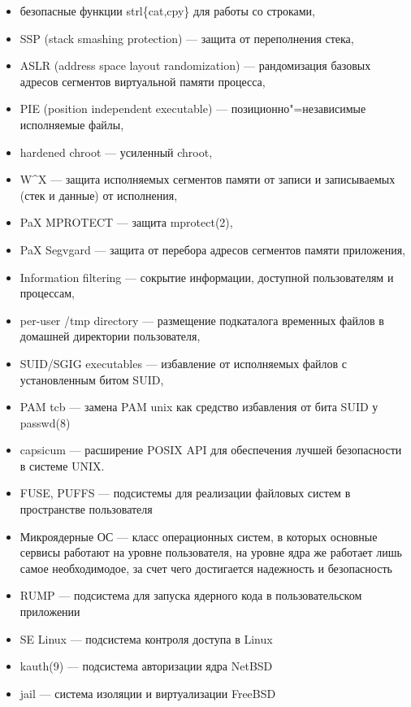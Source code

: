 \documentclass[10pt, a5paper]{article}
\begin{document}
\begin{itemize}
  \item безопасные функции strl\{cat,cpy\} для работы со строками,
  \item SSP (stack smashing protection) --- защита от переполнения стека,
  \item ASLR (address space layout randomization) --- рандомизация базовых адресов сегментов виртуальной памяти процесса,
  \item PIE (position independent executable) --- позиционно"=независимые исполняемые файлы,
  \item hardened chroot --- усиленный chroot,
  \item W\^{}X --- защита исполняемых сегментов памяти от записи и записываемых (стек и данные) от исполнения,
  \item PaX MPROTECT --- защита mprotect(2),
  \item PaX Segvgard --- защита от перебора адресов сегментов памяти приложения,
  \item Information filtering --- сокрытие информации, доступной пользователям и процессам,
  \item per-user /tmp directory --- размещение подкаталога временных файлов в домашней директории пользователя,
  \item SUID/SGIG executables --- избавление от исполняемых файлов с установленным битом SUID,
  \item PAM tcb --- замена PAM unix как средство избавления от бита SUID у passwd(8)
  \item capsicum --- расширение POSIX API для обеспечения лучшей безопасности в системе UNIX.
  \item FUSE, PUFFS --- подсистемы для реализации файловых систем в пространстве пользователя
  \item Микроядерные ОС --- класс операционных систем, в которых основные сервисы работают на уровне пользователя, на уровне ядра же работает лишь самое необходимодое, за счет чего достигается надежность и безопасность
  \item RUMP --- подсистема для запуска ядерного кода в пользовательском приложении
  \item SE Linux --- подсистема контроля доступа в Linux
  \item kauth(9) --- подсистема авторизации ядра NetBSD
  \item jail --- система изоляции и виртуализации FreeBSD
\end{itemize}
\end{document}
